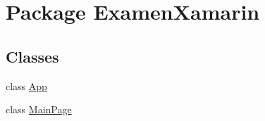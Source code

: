 \hypertarget{namespace_examen_xamarin}{}\section{Package Examen\+Xamarin}
\label{namespace_examen_xamarin}
\subsection*{Classes}
\begin{DoxyCompactItemize}
\item 
class \hyperlink{class_examen_xamarin_1_1_app}{App}
\item 
class \hyperlink{class_examen_xamarin_1_1_main_page}{Main\+Page}
\end{DoxyCompactItemize}
